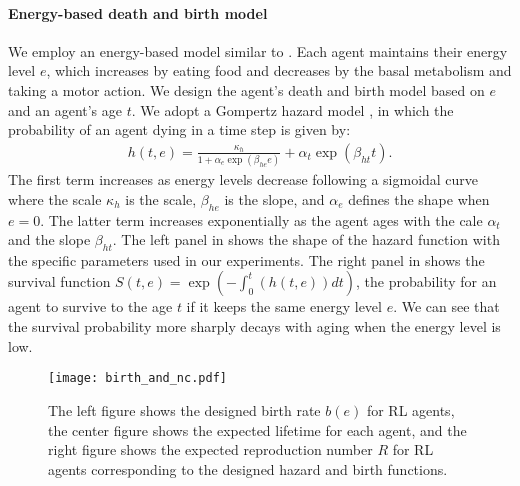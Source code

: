 \paragraph{Energy-based death and birth model}
We employ an energy-based model similar to \citet{hamonEcoevolutionaryDynamicsNonepisodic2023}. Each agent maintains their energy level $e$,
which increases by eating food and decreases by the basal metabolism and taking a motor action.
We design the agent's death and birth model
based on $e$ and an agent's age $t$.
We adopt a Gompertz hazard model \citep{gompertzXXIVNatureFunction1825,kirkwoodDecipheringDeathCommentary2015}, in which the probability of an agent dying in a time step is given by:
\begin{align}
  h(t, e) = \frac{\kappa_{h}}{1 + \alpha_{e}\exp(\beta_{he}e)} + \alpha_{t} \exp(\beta_{ht} t).
  \label{eq:h}
\end{align}
The first term increases as energy levels decrease following a sigmoidal curve where the scale $\kappa_{h}$ is the scale, $\beta_{he}$ is the slope, and $\alpha_{e}$ defines the shape when $e=0$.
The latter term increases exponentially as the agent ages with the cale $\alpha_{t}$ and the slope $\beta_{ht}$.
The left panel in  shows the shape of the hazard function with the specific parameters used in our experiments.
The right panel in  shows the survival function $S(t, e) = \exp (-\int_{0}^{t}(h(t, e)) dt)$, the probability for an agent to survive to the age $t$ if it keeps the same energy level $e$.
We can see that the survival probability more sharply decays with aging when the energy level is low.

\begin{figure}[t]
  \centering{}
  \texttt{[image: birth\_and\_nc.pdf]}
  \caption{
    The left figure shows the designed birth rate $b(e)$ for RL agents, the center figure shows the expected lifetime for each agent, and the right figure shows the expected reproduction number $R$ for RL agents corresponding to the designed hazard and birth functions.
  }\label{figure:bnc}
\end{figure}

